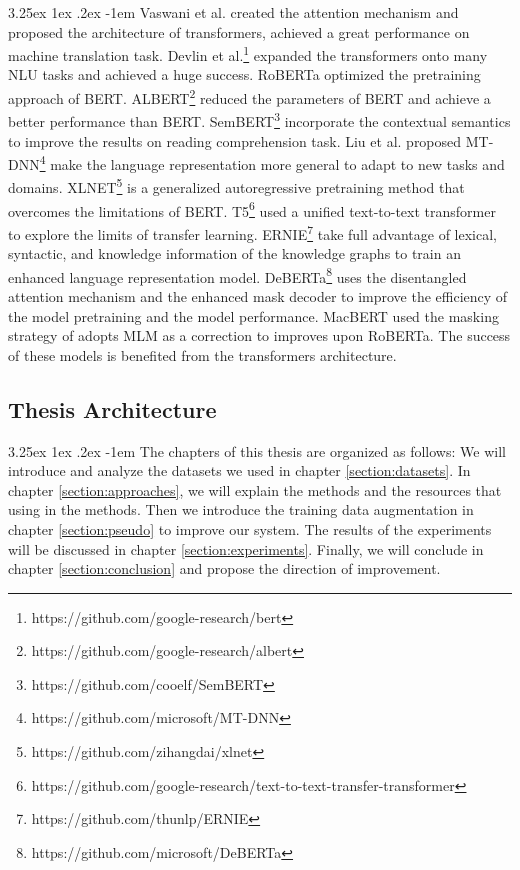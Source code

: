 \documentclass[12pt]{article}
\makeatletter
\renewcommand\paragraph{\@startsection{paragraph}{5}{\z@}%
  {3.25ex \@plus1ex \@minus.2ex}%
  {-1em}%
  {\normalfont\normalsize\bfseries}}
\makeatother
\begin{document}
\begin{CJK*}{UTF8}{bkai}
\begin{spacing}{1.77}
\paragraph{}
Vaswani et al.\cite{vaswani2017attention} created the attention mechanism and proposed the architecture of transformers, achieved a great performance on machine translation task. Devlin et al.\footnote{https://github.com/google-research/bert}\cite{devlin2018bert} expanded the transformers onto many NLU tasks and achieved a huge success. RoBERTa\cite{liu2019roberta} optimized the pretraining approach of BERT. ALBERT\footnote{https://github.com/google-research/albert}\cite{lan2020albert} reduced the parameters of BERT and achieve a better performance than BERT. SemBERT\footnote{https://github.com/cooelf/SemBERT}\cite{zhang2020sembert} incorporate the contextual semantics to improve the results on reading comprehension task. Liu et al.\cite{liu2019mtdnn} proposed MT-DNN\footnote{https://github.com/microsoft/MT-DNN} make the language representation more general to adapt to new tasks and domains. XLNET\footnote{https://github.com/zihangdai/xlnet}\cite{yang2020xlnet} is a generalized autoregressive pretraining method that overcomes the limitations of BERT. T5\footnote{https://github.com/google-research/text-to-text-transfer-transformer}\cite{raffel2020t5} used a unified text-to-text transformer to explore the limits of transfer learning. ERNIE\footnote{https://github.com/thunlp/ERNIE}\cite{zhang2019ernie} take full advantage of lexical, syntactic, and knowledge information of the knowledge graphs to train an enhanced language representation model. DeBERTa\footnote{https://github.com/microsoft/DeBERTa}\cite{he2021deberta} uses the disentangled attention mechanism and the enhanced mask decoder to improve the efficiency of the model pretraining and the model performance. MacBERT\cite{Cui_2020} used the masking strategy of adopts MLM as a correction to improves upon RoBERTa. The success of these models is benefited from the transformers architecture.

\subsection{Thesis Architecture}
\paragraph{}
The chapters of this thesis are organized as follows: We will introduce and analyze the datasets we used in chapter \ref{section:datasets}. In chapter \ref{section:approaches}, we will explain the methods and the resources that using in the methods. Then we introduce the training data augmentation in chapter \ref{section:pseudo} to improve our system. The results of the experiments will be discussed in chapter \ref{section:experiments}. Finally, we will conclude in chapter \ref{section:conclusion} and propose the direction of improvement.


\end{spacing}
\end{CJK*}
\end{document}
